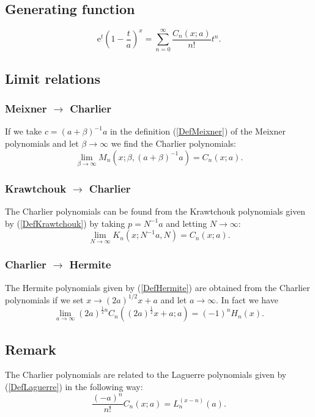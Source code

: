 \documentclass[envcountchap,graybox]{svmono}
\newcounter{rom}
\newcommand{\e}{\textrm{e}}
\begin{document}
\subsection*{Generating function}
\begin{equation}
\label{GenCharlier}
\e^t\left(1-\frac{t}{a}\right)^x=\sum_{n=0}^{\infty}\frac{C_n(x;a)}{n!}t^n.
\end{equation}

\subsection*{Limit relations}

\subsubsection*{Meixner $\rightarrow$ Charlier}
If we take $c=(a+\beta)^{-1}a$ in the definition (\ref{DefMeixner}) of the Meixner polynomials
and let $\beta\rightarrow\infty$ we find the Charlier polynomials:
$$\lim_{\beta\rightarrow\infty}M_n(x;\beta,(a+\beta)^{-1}a)=C_n(x;a).$$

\subsubsection*{Krawtchouk $\rightarrow$ Charlier}
The Charlier polynomials can be found from the Krawtchouk polynomials given by
(\ref{DefKrawtchouk}) by taking $p=N^{-1}a$ and letting $N\rightarrow\infty$:
$$\lim_{N\rightarrow\infty}K_n(x;N^{-1}a,N)=C_n(x;a).$$

\subsubsection*{Charlier $\rightarrow$ Hermite}
The Hermite polynomials given by (\ref{DefHermite}) are obtained from the Charlier polynomials
if we set $x\rightarrow (2a)^{1/2}x+a$ and let $a\rightarrow\infty$. In fact we have
\begin{equation}
\lim_{a\rightarrow\infty}
(2a)^{\frac{1}{2}n}C_n((2a)^{\frac{1}{2}}x+a;a)=(-1)^nH_n(x).
\end{equation}

\subsection*{Remark}
The Charlier polynomials are related to the Laguerre polynomials given by (\ref{DefLaguerre})
in the following way:
$$\frac{(-a)^n}{n!}C_n(x;a)=L_n^{(x-n)}(a).$$
\label{sec9.12}
\end{document}
